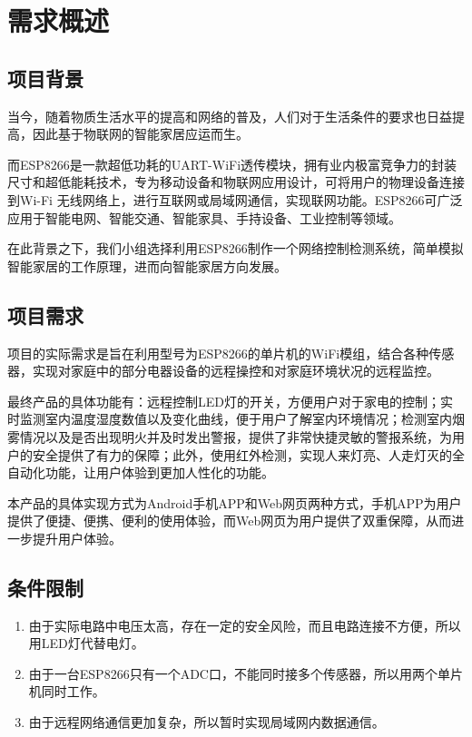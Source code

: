 
\chapter{需求概述}
\section{项目背景}

当今，随着物质生活水平的提高和网络的普及，人们对于生活条件的要求也日益提高，因此基于物联网的智能家居应运而生。

而ESP8266是一款超低功耗的UART-WiFi透传模块，拥有业内极富竞争力的封装尺寸和超低能耗技术，专为移动设备和物联网应用设计，可将用户的物理设备连接到Wi-Fi 无线网络上，进行互联网或局域网通信，实现联网功能。ESP8266可广泛应用于智能电网、智能交通、智能家具、手持设备、工业控制等领域。

在此背景之下，我们小组选择利用ESP8266制作一个网络控制检测系统，简单模拟智能家居的工作原理，进而向智能家居方向发展。

\section{项目需求}

项目的实际需求是旨在利用型号为ESP8266的单片机的WiFi模组，结合各种传感器，实现对家庭中的部分电器设备的远程操控和对家庭环境状况的远程监控。

最终产品的具体功能有：远程控制LED灯的开关，方便用户对于家电的控制；实时监测室内温度湿度数值以及变化曲线，便于用户了解室内环境情况；检测室内烟雾情况以及是否出现明火并及时发出警报，提供了非常快捷灵敏的警报系统，为用户的安全提供了有力的保障；此外，使用红外检测，实现人来灯亮、人走灯灭的全自动化功能，让用户体验到更加人性化的功能。

本产品的具体实现方式为Android手机APP和Web网页两种方式，手机APP为用户提供了便捷、便携、便利的使用体验，而Web网页为用户提供了双重保障，从而进一步提升用户体验。

\section{条件限制}

\begin{enumerate}
    \item 由于实际电路中电压太高，存在一定的安全风险，而且电路连接不方便，所以用LED灯代替电灯。
    \item 由于一台ESP8266只有一个ADC口，不能同时接多个传感器，所以用两个单片机同时工作。
    \item 由于远程网络通信更加复杂，所以暂时实现局域网内数据通信。
\end{enumerate}